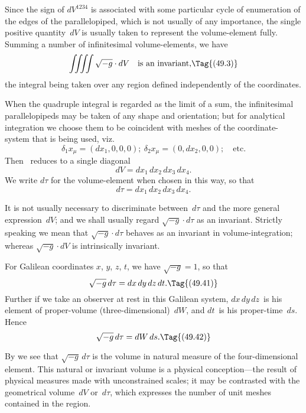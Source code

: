 \documentclass[12pt]{book}
\begin{document}
Since the sign of $dV^{1234}$ is associated with some particular cycle of
enumeration of the edges of the parallelopiped, which is not usually of any
importance, the single positive quantity~$dV$ is usually taken to represent the
volume\hyp{}element fully. Summing a number of infinitesimal volume\hyp{}elements,
%
we have
\[
\iiiint \sqrt{-g} \cdot dV\quad\text{is an invariant,}
\Tag{(49.3)}
\]
the integral being taken over any region defined independently of the
coordinates.

When the quadruple integral is regarded as the limit of a sum, the infinitesimal
parallelopipeds may be taken of any shape and orientation; but for
analytical integration we choose them to be coincident with meshes of the
coordinate\hyp{}system that is being used, viz.\
\[
\delta_{1} x_{\mu} = (dx_{1}, 0, 0, 0);\
\delta_{2} x_{\mu} = (0, dx_{2} , 0, 0);\quad\text{etc.}
\]
Then ~reduces to a single diagonal
\[
dV = dx_{1}\, dx_{2}\, dx_{3}\, dx_{4}.
\]
We write $d\tau$ for the volume\hyp{}element when chosen in this way, so that
\[
d\tau = dx_{1}\, dx_{2}\, dx_{3}\, dx_{4}.
\]

It is not usually necessary to discriminate between~$d\tau$ and the more
general expression~$dV$; and we shall usually regard $\sqrt{-g} \cdot d\tau$ as an invariant.
Strictly speaking we mean that $\sqrt{-g} \cdot d\tau$ behaves as an invariant in volume\hyp{}integration;
whereas $\sqrt{-g} \cdot dV$ is intrinsically invariant.

For Galilean coordinates $x$, $y$, $z$, $t$, we have $\sqrt{-g} = 1$, so that
\[
\sqrt{-g}\, d\tau = dx\, dy\, dz\, dt.
\Tag{(49.41)}
\]
Further if we take an observer at rest in this Galilean system, $dx\, dy\,dz$~is his
element of proper\hyp{}volume (three\hyp{}dimensional)~$dW$, and $dt$~is his proper\hyp{}time~$ds$.
\index{Proper\hyp{}volume}%
Hence
\[
\sqrt{-g}\, d\tau = dW\, ds.
\Tag{(49.42)}
\]

By  we see that $\sqrt{-g}\, d\tau$ is the volume in natural measure of the
four\hyp{}dimensional element. This natural or invariant volume is a physical
conception---the result of physical measures made with unconstrained scales;
it may be contrasted with the geometrical volume~$dV$ or~$d\tau$, which expresses
the number of unit meshes contained in the region.
\end{document}

